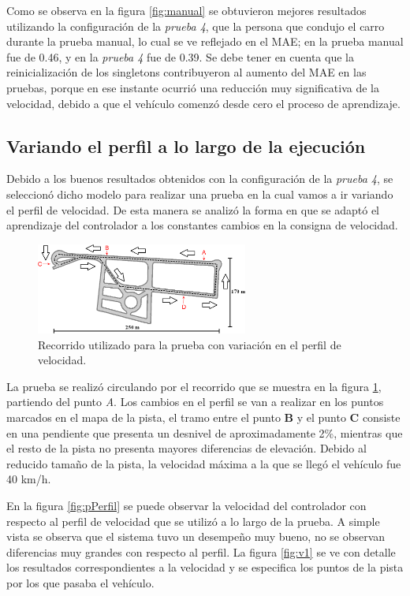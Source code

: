 Como se observa en la figura \ref{fig:manual} se obtuvieron mejores resultados utilizando la configuración de la \textit{prueba 4}, que la persona que condujo el carro durante la prueba manual, lo cual se ve reflejado en el \gls{MAE}; en la prueba manual fue de 0.46, y en la \textit{prueba 4} fue de 0.39. Se debe tener en cuenta que la reinicialización de los singletons contribuyeron al aumento del \gls{MAE} en las pruebas, porque en ese instante ocurrió una reducción muy significativa de la velocidad, debido a que el vehículo comenzó desde cero el proceso de aprendizaje.

\subsection{Variando el perfil a lo largo de la ejecución}
\label{subsec:variandoP}

Debido a los buenos resultados obtenidos con la configuración de la \textit{prueba 4}, se seleccionó dicho modelo para realizar una prueba en la cual vamos a ir variando el perfil de velocidad. De esta manera se  analizó la forma en que se adaptó el aprendizaje del controlador a los constantes cambios en la consigna de velocidad.

\begin{figure}[htb]
\centering
\includegraphics[width=0.6\linewidth, height = 3cm]{figures/zoconp6.png}
\caption{Recorrido utilizado para la prueba con variación en el perfil de velocidad.}
\label{fig:zoconp6}
\end{figure}

La prueba se realizó circulando por el recorrido que se muestra en la figura \ref{fig:zoconp6}, partiendo del punto \textit{A}. Los cambios en el perfil se van a realizar en los puntos marcados en el mapa de la pista, el tramo entre el punto \textbf{B} y el punto \textbf{C} consiste en una pendiente que presenta un desnivel de aproximadamente 2\%, mientras que el resto de la pista no presenta mayores diferencias de elevación. Debido al reducido tamaño de la pista, la velocidad máxima a la que se llegó el vehículo fue 40 km/h.

En la figura \ref{fig:pPerfil} se puede observar la velocidad del controlador con respecto al perfil de velocidad que se utilizó a lo largo de la prueba. A simple vista se observa que el sistema tuvo un desempeño muy bueno, no se observan diferencias muy grandes con respecto al perfil. La figura \ref{fig:v1} se ve con detalle los resultados correspondientes a la velocidad y se especifica los puntos de la pista por los que pasaba el vehículo.

